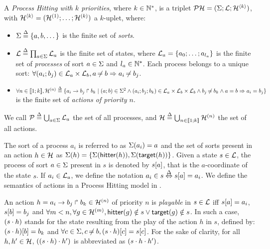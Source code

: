 \begin{definition} 
  A \emph{Process Hitting with $k$ priorities}, where $k \in \mathbb{N}^*$, is a triplet $\mathcal{PH} = (\Sigma; \mathcal{L}; \mathcal{H}^{\langle k \rangle})$, with $\mathcal{H}^{\langle k \rangle} = (\mathcal{H}^{(1)}; \dots; \mathcal{H}^{(k)})$ a $k$-uplet, where:
  \begin{itemize}
    \item $\Sigma \stackrel{\Delta}= \{a,b,\dots\}$ is the finite set of \emph{sorts}.
    \item $\mathcal{L} \stackrel{\Delta}= \prod_{a \in \Sigma} \mathcal{L}_a$ is the finite set of states, where $\mathcal{L}_a = \{a_0 ; \ldots ; a_{l_a}\}$ is the finite set of \emph{processes} of sort $a \in \Sigma$ and $l_a \in \mathbb{N}^*$. Each process belongs to a unique sort: $\forall (a_i; b_j) \in \mathcal{L}_a \times \mathcal{L}_b, a \not\nobreak\mkern -2mu = b \Rightarrow a_i \not\nobreak\mkern -2mu = b_j$.
    \item $\forall n \in \llbracket 1; k \rrbracket, \mathcal{H}^{(n)} \stackrel{\Delta}= \{a_i\rightarrow b_j\Rsh b_k \mid (a; b) \in \Sigma^2 \wedge (a_i; b_j; b_k) \in \mathcal{L}_a \times \mathcal{L}_b \times \mathcal{L}_b \wedge b_j \not\nobreak\mkern -2mu = b_k \wedge a = b \Rightarrow a_i = b_j \}$ is the finite set of \emph{actions of priority $n$}.
  \end{itemize}
  We call $\mathcal{P} \stackrel{\Delta}= \bigcup_{a \in \Sigma} \mathcal{L}_a$ the set of all processes, and $\mathcal{H} \stackrel{\Delta}= \bigcup_{n \in \llbracket 1; k \rrbracket} \mathcal{H}^{(n)}$ the set of all actions.
\end{definition}

\noindent
The sort of a process $a_i$ is referred to as $\Sigma(a_i)=a$ and the set of sorts present in an action $h\in\mathcal{H}$ as $\Sigma(h) = \{\Sigma(\mathsf{hitter}(h)),\Sigma(\mathsf{target}(h))\}$.
Given a state $s\in \mathcal{L}$, the process of sort $a\in\Sigma$ present in $s$ is denoted by ${s[a]}$, that is the $a$-coordinate of the state $s$.
If $a_i\in \mathcal{L}_a$, we define the notation $a_i\in s \stackrel{\Delta}\Leftrightarrow {s[a]}=a_i$.
We define the semantics of actions in a Process Hitting model in .

\begin{definition}
\label{def:play}
  An action $h = a_i\rightarrow b_j\Rsh b_k \in \mathcal{H}^{(n)}$ of priority $n$ is \emph{playable} in $s \in \mathcal{L}$ iff ${s[a]} = a_i$, ${s[b]} = b_j$ and $\forall m < n, \forall g \in \mathcal{H}^{(m)}, \mathsf{hitter}(g) \notin s \vee \mathsf{target}(g) \notin s$.
  In such a case, $(s \cdot h)$ stands for the state resulting from the play of the action $h$ in $s$, defined by: ${(s \cdot h)[b]} = b_k$ and $\forall c\in\Sigma, c\not\nobreak\mkern -2mu = b, {(s\cdot h)[c]} = {s[c]}$.
  For the sake of clarity, for all $h, h'\in\mathcal{H}$, $((s\cdot h)\cdot h')$ is abbreviated as $(s\cdot h\cdot h')$.
\end{definition}

